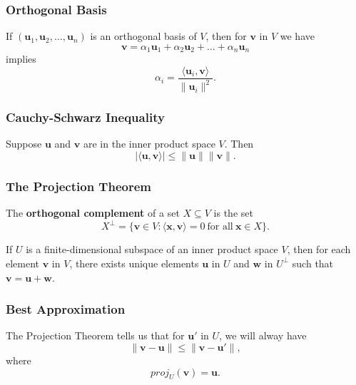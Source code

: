 \documentclass{beamer}
\begin{document}
\begin{frame}
\frametitle{Orthogonal Basis}
If $({\boldsymbol u_1}, {\boldsymbol u_2},\ldots, {\boldsymbol u_n})$ is an orthogonal basis of $V$, then for ${\boldsymbol v}$ in $V$ we have
$$
{\boldsymbol v} = \alpha_1 {\boldsymbol u_1} + \alpha_2 {\boldsymbol u_2} +\ldots + \alpha_n {\boldsymbol u_n}
$$ 
implies
$$
\alpha_i = \frac{\langle {\boldsymbol u_i}, {\boldsymbol v} \rangle}{\|{\boldsymbol u_i}\|^2}.
$$
\end{frame}

\begin{frame}
\frametitle{Cauchy-Schwarz Inequality}
\begin{Theorem}
Suppose ${\boldsymbol u}$ and ${\boldsymbol v}$ are in the inner product space $V$. Then
$$
|\langle {\boldsymbol u}, {\boldsymbol v}\rangle| \leq \|{\boldsymbol u}\| \|{\boldsymbol v}\|.
$$
\end{Theorem}
\end{frame}

\begin{frame}
\frametitle{The Projection Theorem}
\begin{Definition}
The {\bf orthogonal complement} of a set $X\subseteq V$ is the set
$$
X^\perp = \{{\boldsymbol v} \in V: \langle {\boldsymbol x}, {\boldsymbol v}\rangle = 0\ \text{for all}\ {\boldsymbol x}\in X\}.
$$
\end{Definition}

\begin{Theorem}
If $U$ is a finite-dimensional subspace of an inner product space $V$, then for each element ${\boldsymbol v}$ in $V$, there exists unique elements ${\boldsymbol u}$ in $U$ and ${\boldsymbol w}$ in $U^\perp$ such that ${\boldsymbol v} = {\boldsymbol u} + {\boldsymbol w}$.
\end{Theorem}
\end{frame}


\begin{frame}
\frametitle{Best Approximation}
The Projection Theorem tells us that for ${\boldsymbol u'}$ in $U$, we will alway have
$$
\| {\boldsymbol v} - {\boldsymbol u}\| \leq \| {\boldsymbol v} - {\boldsymbol u'}\|,
$$
where
$$
proj_U({\boldsymbol v})= {\boldsymbol u }.
$$

\end{frame}
\end{document}
